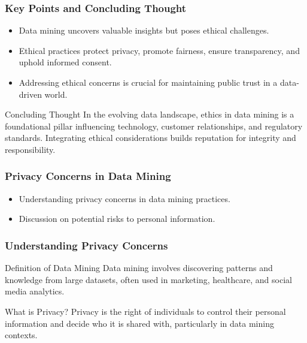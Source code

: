 \documentclass[aspectratio=169]{beamer}
\begin{document}
\begin{frame}[fragile]
    \frametitle{Key Points and Concluding Thought}
    
    \begin{itemize}
        \item Data mining uncovers valuable insights but poses ethical challenges.
        \item Ethical practices protect privacy, promote fairness, ensure transparency, and uphold informed consent.
        \item Addressing ethical concerns is crucial for maintaining public trust in a data-driven world.
    \end{itemize}
    
    \begin{block}{Concluding Thought}
        In the evolving data landscape, ethics in data mining is a foundational pillar influencing technology, customer relationships, and regulatory standards.
        Integrating ethical considerations builds reputation for integrity and responsibility.
    \end{block}
\end{frame}

\begin{frame}[fragile]
    \frametitle{Privacy Concerns in Data Mining}
    \begin{itemize}
        \item Understanding privacy concerns in data mining practices.
        \item Discussion on potential risks to personal information.
    \end{itemize}
\end{frame}

\begin{frame}[fragile]
    \frametitle{Understanding Privacy Concerns}
    \begin{block}{Definition of Data Mining}
        Data mining involves discovering patterns and knowledge from large datasets, often used in marketing, healthcare, and social media analytics.
    \end{block}
    
    \begin{block}{What is Privacy?}
        Privacy is the right of individuals to control their personal information and decide who it is shared with, particularly in data mining contexts.
    \end{block}
\end{frame}
\end{document}

